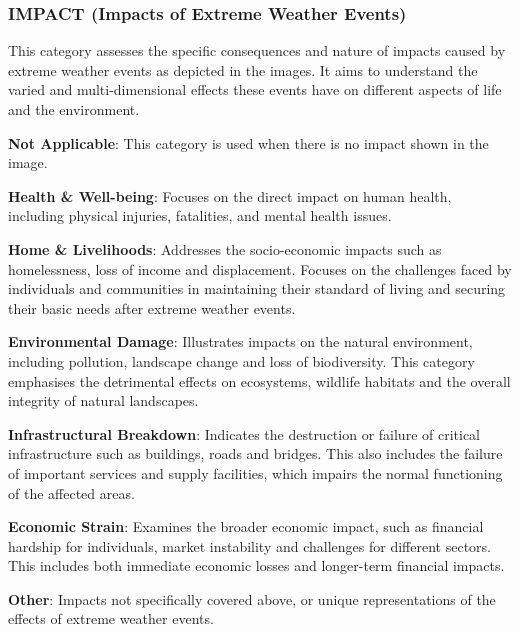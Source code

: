 \subsubsection*{IMPACT (Impacts of Extreme Weather Events)}
\label{subsubsec:impact}
This category assesses the specific consequences and nature of impacts caused by extreme weather events as depicted in the images. It aims to understand the varied and multi-dimensional effects these events have on different aspects of life and the environment. 

\begin{description}[leftmargin=2.5cm, style=multiline, labelwidth=1.5cm]
\item[0]\textbf{Not Applicable}: This category is used when there is no impact shown in the image.
\item[1] \textbf{Health \& Well-being}: Focuses on the direct impact on human health, including physical injuries, fatalities, and mental health issues.
\item[2] \textbf{Home \& Livelihoods}: Addresses the socio-economic impacts such as homelessness, loss of income and displacement. Focuses on the challenges faced by individuals and communities in maintaining their standard of living and securing their basic needs after extreme weather events.
\item[3] \textbf{Environmental Damage}: Illustrates impacts on the natural environment, including pollution, landscape change and loss of biodiversity. This category emphasises the detrimental effects on ecosystems, wildlife habitats and the overall integrity of natural landscapes.
\item[4] \textbf{Infrastructural Breakdown}: Indicates the destruction or failure of critical infrastructure such as buildings, roads and bridges. This also includes the failure of important services and supply facilities, which impairs the normal functioning of the affected areas.
\item[5] \textbf{Economic Strain}: Examines the broader economic impact, such as financial hardship for individuals, market instability and challenges for different sectors. This includes both immediate economic losses and longer-term financial impacts.
\item[6] \textbf{Other}: Impacts not specifically covered above, or unique representations of the effects of extreme weather events.
\end{description}

